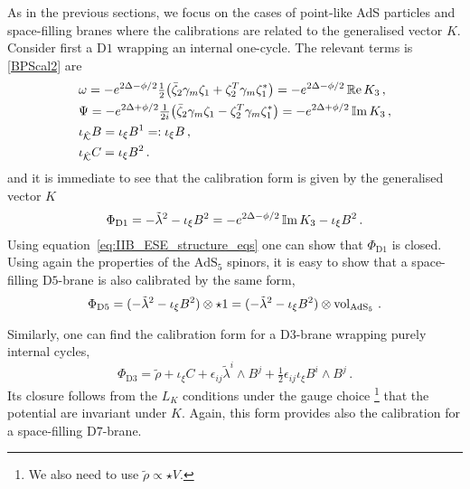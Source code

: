 \documentclass[debug]{phd}
\begin{document}
As in the previous sections, we focus on the cases of point-like AdS particles and space-filling branes where the calibrations are related to the generalised vector $K$. 
Consider first a D$1$ wrapping an internal one-cycle. 
The relevant terms is \eqref{BPScal2} are 
%
	\begin{equation} 
		\begin{aligned}
			&\omega =- e^{2\Delta-\phi/2} \tfrac{1}{2} \left(\bar{\zeta}_2 \gamma_m \zeta_1 + \zeta_2^T\gamma_m \zeta_1^* \right) = - e^{2\Delta-\phi/2} \RRe K_3\, , \\
			&\Psi =- e^{2\Delta+\phi/2}\tfrac{1}{2i} \left(\bar{\zeta}_2 \gamma_m \zeta_1 - \zeta_2^T\gamma_m \zeta_1^* \right) = - e^{2\Delta+\phi/2} \IIm K_3\, , \\
			&\iota_{\hat{\mathcal{K}}} B = \iota_\xi B^1 =: \iota_\xi B\, , \\
			&\iota_{\hat{\mathcal{K}}} C = \iota_\xi B^2\, .
		\end{aligned}
	\end{equation} 
%
and it is immediate to see that the calibration form is given by the generalised vector $K$
%
	\begin{equation} 
		\Phi_{\mathrm{D}1} = -\tilde{\lambda}^2 -\iota_\xi B^2 = -e^{2\Delta-\phi/2} \operatorname{\mathbb{I}m} K_3 -\iota_\xi B^2\, .
	\end{equation} 
Using equation~\eqref{eq:IIB_ESE_structure_eqs} one can show that $\Phi_{\mathrm{D}1}$ is closed. 
Using again the properties of the $\mathrm{AdS}_5$ spinors, it is easy to show that a space-filling D$5$-brane is also calibrated by the same form,
%
	\begin{equation} 
		\Phi_{\mathrm{D}5} = ( -\tilde{\lambda}^2 -\iota_\xi B^2) \otimes \star 1 =( -\tilde{\lambda}^2 -\iota_\xi B^2) \otimes \operatorname{vol}_{\mathrm{AdS}_5} \, .
	\end{equation} 
%

Similarly, one can find the calibration form for a D$3$-brane wrapping purely internal cycles,
%
	\begin{equation} 
	\label{D3cal}
		\Phi_{\mathrm{D}3}= \tilde{\rho} +\iota_\xi C +\epsilon_{ij}\tilde{\lambda}^i \wedge B^j + \tfrac{1}{2}\epsilon_{ij}\iota_\xi B^i \wedge B^j\, .
	\end{equation} 
%
Its closure follows from the $L_K$ conditions under the gauge choice%
		\footnote{%
		We also need to use $\tilde{\rho} \propto \star V$.%
		} that the potential are invariant under $K$.
Again, this form provides also the calibration for a space-filling D$7$-brane.
\end{document}
